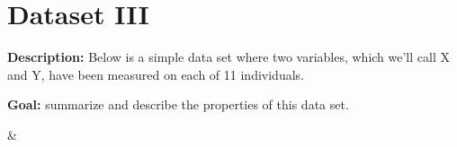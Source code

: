 \documentclass[12pt]{article}
\begin{document}
\section*{Dataset III}

\textbf{Description:} Below is a simple  data set where two variables, which we'll call X and Y, have been measured on each of 11 individuals.

\textbf{Goal:} summarize and describe the properties of this data set.

\begin{center}
%
{\csvcoli & \csvcolii}
\end{center}
\end{document}
